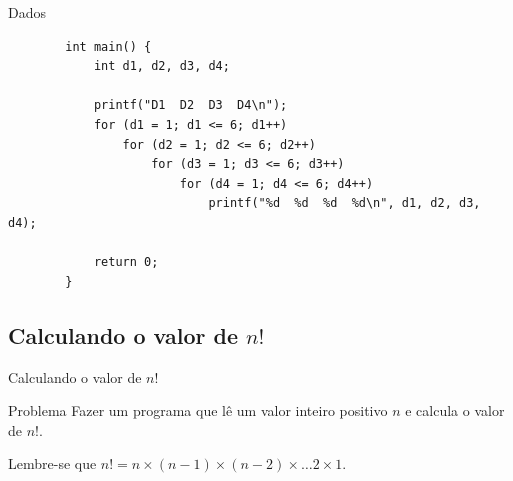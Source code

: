 \documentclass[handout]{beamer}
\begin{document}
\begin{frame}[fragile]{Dados}

    \begin{verbatim}
        int main() {
            int d1, d2, d3, d4;
            
            printf("D1  D2  D3  D4\n");
            for (d1 = 1; d1 <= 6; d1++)
                for (d2 = 1; d2 <= 6; d2++)
                    for (d3 = 1; d3 <= 6; d3++)
                        for (d4 = 1; d4 <= 6; d4++)
                            printf("%d  %d  %d  %d\n", d1, d2, d3, d4);

            return 0;
        }
    \end{verbatim}
\end{frame}

\subsection{Calculando o valor de $n!$}%

\begin{frame}[fragile]{Calculando o valor de $n!$}

    \begin{block}{Problema}
        Fazer um programa que lê um valor inteiro positivo $n$ e calcula o valor de $n!$.
    \end{block}

    Lembre-se que $n! = n \times (n-1) \times (n-2) \times \ldots 2 \times 1$.
\end{frame}
\end{document}

